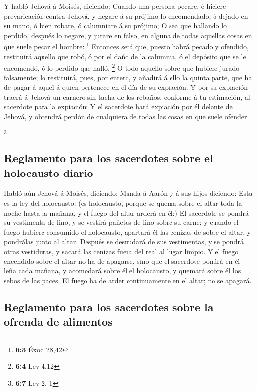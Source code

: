  Y habló Jehová á Moisés, diciendo:  Cuando
una persona pecare, é hiciere prevaricación contra Jehová, y negare á su
prójimo lo encomendado, ó dejado en su mano, ó bien robare, ó calumniare
á su prójimo;  O sea que hallando lo perdido, después lo
negare, y jurare en falso, en alguna de todas aquellas cosas en que
suele pecar el hombre: \footnote{\textbf{6:3} Éxod 28,42} 
Entonces será que, puesto habrá pecado y ofendido, restituirá aquello
que robó, ó por el daño de la calumnia, ó el depósito que se le
encomendó, ó lo perdido que halló, \footnote{\textbf{6:4} Lev 4,12}
 O todo aquello sobre que hubiere jurado falsamente; lo
restituirá, pues, por entero, y añadirá á ello la quinta parte, que ha
de pagar á aquel á quien pertenece en el día de su expiación.
 Y por su expiación traerá á Jehová un carnero sin tacha
de los rebaños, conforme á tu estimación, al sacerdote para la
expiación:  Y el sacerdote hará expiación por él delante
de Jehová, y obtendrá perdón de cualquiera de todas las cosas en que
suele ofender.

\footnote{\textbf{6:7} Lev 2,-1}

\hypertarget{reglamento-para-los-sacerdotes-sobre-el-holocausto-diario}{%
\subsection{Reglamento para los sacerdotes sobre el holocausto
diario}\label{reglamento-para-los-sacerdotes-sobre-el-holocausto-diario}}

 Habló aún Jehová á Moisés, diciendo:  Manda
á Aarón y á sus hijos diciendo: Esta es la ley del holocausto: (es
holocausto, porque se quema sobre el altar toda la noche hasta la
mañana, y el fuego del altar arderá en él:)  El sacerdote
se pondrá su vestimenta de lino, y se vestirá pañetes de lino sobre su
carne; y cuando el fuego hubiere consumido el holocausto, apartará él
las cenizas de sobre el altar, y pondrálas junto al altar.
 Después se desnudará de sus vestimentas, y se pondrá
otras vestiduras, y sacará las cenizas fuera del real al lugar limpio.
 Y el fuego encendido sobre el altar no ha de apagarse,
sino que el sacerdote pondrá en él leña cada mañana, y acomodará sobre
él el holocausto, y quemará sobre él los sebos de las paces.
 El fuego ha de arder continuamente en el altar; no se
apagará.

\hypertarget{reglamento-para-los-sacerdotes-sobre-la-ofrenda-de-alimentos}{%
\subsection{Reglamento para los sacerdotes sobre la ofrenda de
alimentos}\label{reglamento-para-los-sacerdotes-sobre-la-ofrenda-de-alimentos}}


